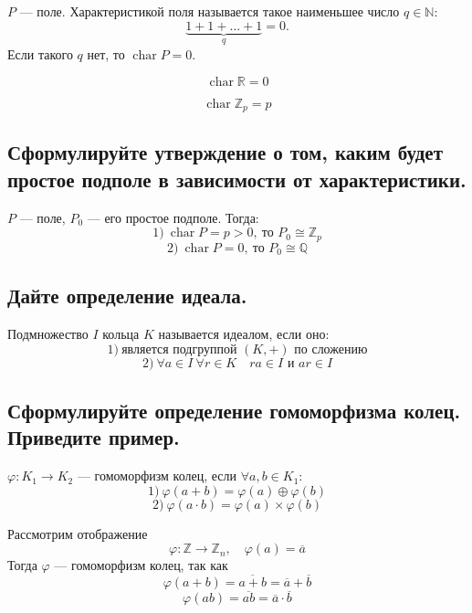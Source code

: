 \begin{definition}
    $P$ --- поле. Характеристикой поля называется такое наименьшее число $q \in \mathbb{N}$:
    \[
        \underbrace{1 + 1 + \ldots + 1}_{q} = 0.
    \]
    Если такого $q$ нет, то $\operatorname{char} P = 0$.
\end{definition}

\begin{example}
    \[
        \operatorname{char} \mathbb{R} = 0
    \]
\end{example}

\begin{example}
    \[
        \operatorname{char} \mathbb{Z}_p = p
    \]
\end{example}


\subsection{Сформулируйте утверждение о том, каким будет простое подполе в зависимости от характеристики.}

\begin{theorem}
    $P$ --- поле, $P_0$ --- его простое подполе. Тогда:
    \[
        1)\ \operatorname{char} P = p > 0,\ \text{то } P_0 \cong \mathbb{Z}_p
    \]
    \[
        2)\ \operatorname{char} P = 0,\ \text{то } P_0 \cong \mathbb{Q}
    \]
\end{theorem}


\subsection{Дайте определение идеала.}

\begin{definition}
    Подмножество $I$ кольца $K$ называется идеалом, если оно:
    \[
        1)\ \text{является подгруппой } (K, +) \text{ по сложению}
    \]
    \[
        2)\ \forall a \in I\ \forall r \in K\quad ra \in I \text{ и } ar \in I
    \]
\end{definition}


\subsection{Сформулируйте определение гомоморфизма колец. Приведите пример.}

\begin{definition}
    $\varphi: K_1 \to K_2$ --- гомоморфизм колец, если $\forall a, b \in K_1$:
    \[
        1)\ \varphi(a + b) = \varphi(a) \oplus \varphi(b)
    \]
    \[
        2)\ \varphi(a \cdot b) = \varphi(a) \times \varphi(b)
    \]
\end{definition}
\begin{example}
    Рассмотрим отображение
    \[
        \varphi: \mathbb{Z} \to \mathbb{Z}_n,\quad \varphi(a) = \overline{a}
    \]
    Тогда $\varphi$ --- гомоморфизм колец, так как
    \[
        \varphi(a + b) = \overline{a + b} = \overline{a} + \overline{b}
    \]
    \[
        \varphi(ab) = \overline{ab} = \overline{a}\cdot \overline{b}
    \]
\end{example}


